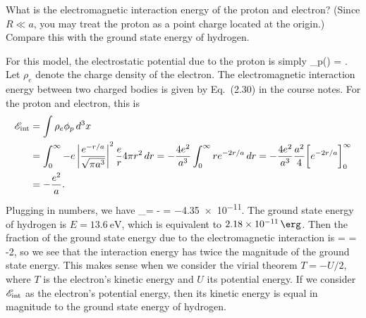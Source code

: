 \newcommand{\rhoe}{\rho_e}
\newcommand{\phip}{\phi_p}
\newcommand{\sEint}{\sE_\text{int}}


\begin{problem}
	What is the electromagnetic interaction energy of the proton and electron?  (Since $R \ll a$, you may treat the proton as a point charge located at the origin.)  Compare this with the ground state energy of hydrogen.
\end{problem}

\begin{solution}
	For this model, the electrostatic potential due to the proton is simply
	\beq
		\phip(\vx) = .
	\eeq
	Let $\rhoe$ denote the charge density of the electron.  The electromagnetic interaction energy between two charged bodies is given by Eq.~(2.30) in the course notes.  For the proton and electron, this is
	\begin{align*}
		\sEint &= \int \rhoe \phip \dcx \\
		&= \int_0^\infty -e \left| \frac{e^{-r/a}}{\sqrt{\pi a^3}} \right|^2 \frac{e}{r} 4\pi r^2 \dr
		= -\frac{4 e^2}{a^3} \int_0^\infty r e^{-2r/a} \dr
		= -\frac{4 e^2}{a^3} \frac{a^2}{4} \bigg[ e^{-2r/a} \bigg]_0^\infty \\
		&= -\frac{e^2}{a}.
	\end{align*}
	Plugging in numbers, we have
	\beq
		\sEint = - = \SI{-4.35e-11}{\erg}.
	\eeq
	The ground state energy of hydrogen is $E = \SI{13.6}{\electronvolt}$, which is equivalent to $\SI{2.18e-11}{\erg}$.  Then the fraction of the ground state energy due to the electromagnetic interaction is
	\beq
		\frac{\sEint}{E} =  = -2,
	\eeq
	so we see that the interaction energy has twice the magnitude of the ground state energy.  This makes sense when we consider the virial theorem $T = -U/2$, where $T$ is the electron's kinetic energy and $U$ its potential energy.  If we consider $\sEint$ as the electron's potential energy, then its kinetic energy is equal in magnitude to the ground state energy of hydrogen.
\end{solution}